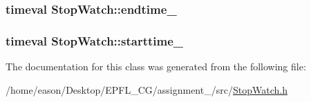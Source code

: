 \subsubsection[{\texorpdfstring{endtime\+\_\+}{endtime_}}]{\setlength{\rightskip}{0pt plus 5cm}timeval Stop\+Watch\+::endtime\+\_\+\hspace{0.3cm}{\ttfamily [private]}}\hypertarget{classStopWatch_ac4092981269811b221e31ab5bc0a8ce2}{}\label{classStopWatch_ac4092981269811b221e31ab5bc0a8ce2}
\subsubsection[{\texorpdfstring{starttime\+\_\+}{starttime_}}]{\setlength{\rightskip}{0pt plus 5cm}timeval Stop\+Watch\+::starttime\+\_\+\hspace{0.3cm}{\ttfamily [private]}}\hypertarget{classStopWatch_ada5556538f0ebec66b6e45b846ca3864}{}\label{classStopWatch_ada5556538f0ebec66b6e45b846ca3864}


The documentation for this class was generated from the following file\+:\begin{DoxyCompactItemize}
\item 
/home/eason/\+Desktop/\+E\+P\+F\+L\+\_\+\+C\+G/assignment\+\_/src/\hyperlink{StopWatch_8h}{Stop\+Watch.\+h}\end{DoxyCompactItemize}
